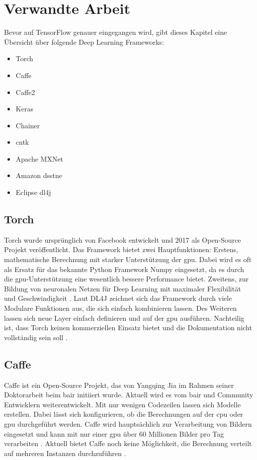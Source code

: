 \section{Verwandte Arbeit}
Bevor auf TensorFlow genauer eingegangen wird, gibt dieses Kapitel eine Übersicht über folgende Deep Learning Frameworks:
\begin{multicols}{2}
	\begin{itemize}
		\item Torch
		\item Caffe
		\item Caffe2
		\item Keras
		\item Chainer
		\item \acs{cntk}
		\item Apache MXNet
		\item Amazon \acs{dsstne}
		\item Eclipse \acl{dl4j}
	\end{itemize}
\end{multicols}
	
\subsection{Torch}
Torch wurde ursprünglich von Facebook entwickelt und 2017 als Open-Source Projekt veröffentlicht. Das Framework bietet zwei Hauptfunktionen: Erstens, mathematische Berechnung mit starker Unterstützung der \ac{gpu}. Dabei wird es oft als Ersatz für das bekannte Python Framework Numpy eingesetzt, da es durch die \ac{gpu}-Unterstützung eine wesentlich bessere Performance bietet. Zweitens, zur Bildung von neuronalen Netzen für Deep Learning mit maximaler Flexibilität und Geschwindigkeit \cite{Torch}. Laut DL4J zeichnet sich das Framework durch viele Modulare Funktionen aus, die sich einfach kombinieren lassen. Des Weiteren lassen sich neue Layer einfach definieren und auf der \ac{gpu} ausführen. Nachteilig ist, dass Torch keinen kommerziellen Einsatz bietet und die Dokumentation nicht vollständig sein soll \cite{DeepLearningFrameworks}. 

\subsection{Caffe}
Caffe ist ein Open-Source Projekt, das von Yangqing Jia im Rahmen seiner Doktorarbeit beim \ac{bair} initiiert wurde. Aktuell wird es vom \ac{bair} und Community Entwicklern weiterentwickelt. Mit nur wenigen Codezeilen lassen sich Modelle erstellen. Dabei lässt sich konfigurieren, ob die Berechnungen auf der \acs{cpu} oder \ac{gpu} durchgeführt werden. Caffe wird hauptsächlich zur Verarbeitung von Bildern eingesetzt und kann mit nur einer \ac{gpu} über 60 Millionen Bilder pro Tag verarbeiten \cite{Caffe}. Aktuell bietet Caffe noch keine Möglichkeit, die Berechnung verteilt auf mehreren Instanzen durchzuführen \cite{DeepLearningFrameworks}.

